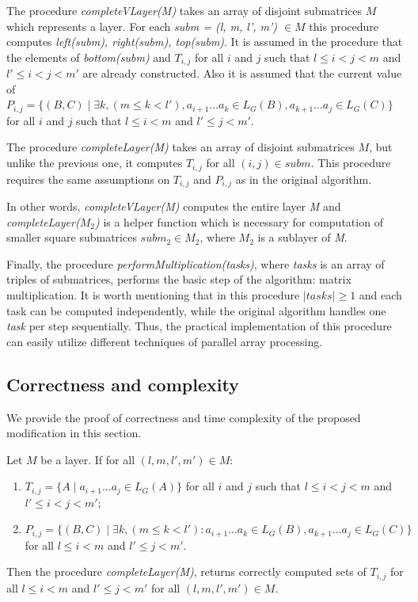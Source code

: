 The procedure \textit{completeVLayer(M)} takes an array of disjoint submatrices $M$ which represents a layer.
For each \textit{subm = (l, m, l', m') $\in M$} this procedure computes \textit{left(subm), right(subm), top(subm)}.
It is assumed in the procedure that the elements of \textit{bottom(subm)} and $T_{i, j}$ for all $i$ and $j$ such that $l \leq i < j < m$ and $  l' \leq i < j < m'$ are already constructed.
Also it is assumed that the current value of
$P_{i, j} =  \{ (B, C) \mid \exists k, (m \le k < l'), a_{i + 1} \dots a_{k} \in L_G(B), a_{k + 1} \dots a_{j} \in L_G(C)\} $ for all $i$ and $j$ such that $l \leq i < m$ and $l' \leq j < m'$.

The procedure \textit{completeLayer(M)} takes an array of disjoint submatrices $M$, but unlike the previous one, it computes $T_{i, j}$ for all $(i, j) \in subm$.
This procedure requires the same assumptions on $T_{i, j}$  and $P_{i, j}$  as in the original algorithm.

In other words, \textit{completeVLayer(M)} computes the entire layer \textit{M} \linebreak and \textit{completeLayer($M_{2}$)} is a helper function which is necessary for computation of smaller square submatrices $subm_{2} \in M_{2}$, where $M_2$ is a sublayer of \textit{M}.

Finally, the procedure \textit{performMultiplication(tasks)}, where \textit{tasks} is an array of triples of submatrices, performs the basic step of the algorithm: matrix multiplication.
It is worth mentioning that in this procedure $|tasks| \ge 1$ and each task can be computed independently, while the original algorithm handles one \textit{task} per step sequentially.
Thus, the practical implementation of this procedure can easily utilize different techniques of parallel array processing.

\subsection{Correctness and complexity}

We provide the proof of correctness and time complexity of the proposed modification in this section.

\begin{lemma}
Let $M$ be a layer. If for all $(l, m, l', m') \in M$:
\begin{enumerate}
  \item $T_{i, j} = \{ A \mid  a_{i + 1} \dots a_{j} \in L_G(A)\}$ for all $i$ and $j$ such that $l \leq i < j < m$ and $l' \leq i < j < m'$;
  \item $P_{i, j} =  \{ (B, C) \mid \exists k, (m \le k < l'): a_{i + 1} \dots a_{k} \in L_G(B), a_{k + 1} \dots a_{j} \in L_G(C)\}$ for all $l \leq i < m$ and $l' \leq j < m'$.
\end{enumerate}

Then the procedure \textit{completeLayer(M)}, returns correctly computed sets of $T_{i, j}$ for all $l \leq i < m$ and $l' \leq j < m'$ for all $(l, m, l', m') \in M$.
\end{lemma}

